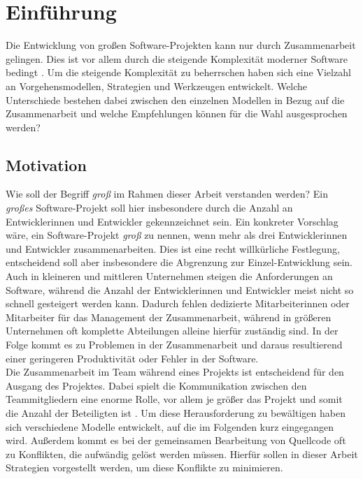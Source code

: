 
\section{Einführung}
\label{sec:einleitung}

Die Entwicklung von großen Software-Projekten kann nur durch Zusammenarbeit gelingen. Dies ist vor allem durch die steigende Komplexität moderner Software bedingt \cite{Wickner:2022:Wie-ist-die-Komplexitat:99}. Um die steigende Komplexität zu beherrschen haben sich eine Vielzahl an Vorgehensmodellen, Strategien und Werkzeugen entwickelt. Welche Unterschiede bestehen dabei zwischen den einzelnen Modellen in Bezug auf die Zusammenarbeit und welche Empfehlungen können für die Wahl ausgesprochen werden? 

\subsection{Motivation}
\label{sec:einleitung:motivation}

Wie soll der Begriff \emph{groß} im Rahmen dieser Arbeit verstanden werden? Ein \emph{großes} Software-Projekt soll hier insbesondere durch die Anzahl an Entwicklerinnen und Entwickler gekennzeichnet sein. Ein konkreter Vorschlag wäre, ein Software-Projekt \emph{groß} zu nennen, wenn mehr als drei Entwicklerinnen und Entwickler zusammenarbeiten. Dies ist eine recht willkürliche Festlegung, entscheidend soll aber insbesondere die Abgrenzung zur Einzel-Entwicklung sein.
\\
Auch in kleineren und mittleren Unternehmen steigen die Anforderungen an Software, während die Anzahl der Entwicklerinnen und Entwickler meist nicht so schnell gesteigert werden kann. Dadurch fehlen dedizierte Mitarbeiterinnen oder Mitarbeiter für das Management der Zusammenarbeit, während in größeren Unternehmen oft komplette Abteilungen alleine hierfür zuständig sind. In der Folge kommt es zu Problemen in der Zusammenarbeit und daraus resultierend einer geringeren Produktivität oder Fehler in der Software.
\\
Die Zusammenarbeit im Team während eines Projekts ist entscheidend für den Ausgang des Projektes. Dabei spielt die Kommunikation zwischen den Teammitgliedern eine enorme Rolle, vor allem je größer das Projekt und somit die Anzahl der Beteiligten ist \cite{Versteegen:2000:Projektmanagement:25}. Um diese Herausforderung zu bewältigen haben sich verschiedene Modelle entwickelt, auf die im Folgenden kurz eingegangen wird. Außerdem kommt es bei der gemeinsamen Bearbeitung von Quellcode oft zu Konflikten, die aufwändig gelöst werden müssen. Hierfür sollen in dieser Arbeit Strategien vorgestellt werden, um diese Konflikte zu minimieren.



